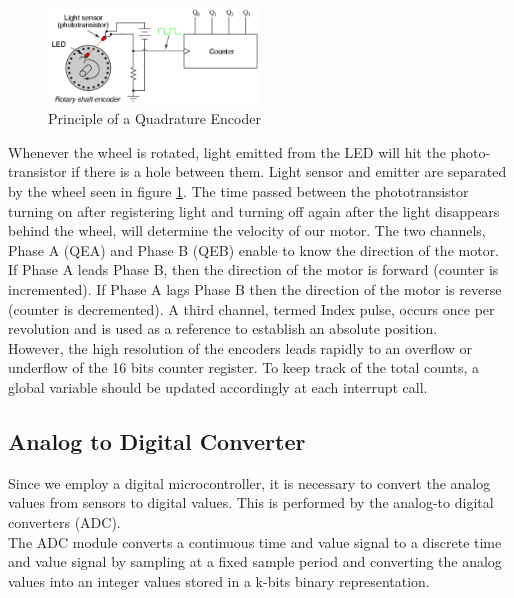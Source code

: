 \begin{figure}[H]
    \centering
    \includegraphics[width=0.5\textwidth]{figures/software/qei_demo.png}
    \caption{Principle of a Quadrature Encoder \cite{alex}}
    \label{fig:qei_demo}
\end{figure}
\vskip 0.2in
\noindent
Whenever the wheel is rotated, light emitted from the LED will hit the photo-transistor if there is a hole between them. Light sensor and emitter are separated by the wheel seen in figure \ref{fig:qei_demo}. The time passed between the phototransistor turning on after registering light and turning off again after the light disappears behind the wheel, will determine the velocity of our motor.
\vskip 0.2in
\noindent
The two channels, Phase A (QEA) and Phase B (QEB) enable to know the direction of the motor. If Phase A leads Phase B, then the direction of the motor is forward (counter is incremented). If Phase A lags Phase B then the direction of the motor is reverse (counter is decremented). A third channel, termed Index pulse, occurs once per revolution and is used as a reference to establish an absolute position.\\
However, the high resolution of the encoders leads rapidly to an overflow or underflow of the 16 bits counter register. To keep track of the total counts, a global variable should be updated accordingly at each interrupt call.

\subsection{Analog to Digital Converter}

Since we employ a digital microcontroller, it is necessary to convert the analog values from sensors to digital values. This is performed by the analog-to digital converters (ADC).\\
The ADC module converts a continuous time and value signal to a discrete time and value signal by sampling at a fixed sample period and converting the analog values into an integer values stored in a k-bits binary representation.

